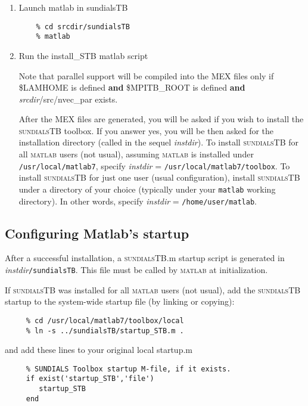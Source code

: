 \documentclass[titlepage,10pt]{article}
\newcommand{\sundialsTB}{{\normalfont\scshape sundialsTB}}
\newcommand{\matlab}{{\normalfont\scshape matlab}}
\begin{document}
\begin{enumerate}

\item Launch matlab in sundialsTB
\begin{verbatim}
    % cd srcdir/sundialsTB
    % matlab
\end{verbatim}

\item Run the install\_STB matlab script

     Note that parallel support will be compiled into the MEX files only if
     \$LAMHOME is defined {\bf and}
     \$MPITB\_ROOT is defined {\bf and}
     {\em srcdir}/src/nvec\_par exists.

     After the MEX files are generated, you will be asked if you wish to install 
     the {\sundialsTB} toolbox. If you answer yes, you will be then asked for the
     installation directory (called in the sequel {\em instdir}). 
     To install {\sundialsTB} for all {\matlab} users (not usual), assuming {\matlab} is 
     installed under {\tt /usr/local/matlab7}, specify
        {\em instdir} = {\tt /usr/local/matlab7/toolbox}.
     To install {\sundialsTB} for just one user (usual configuration), install      
     {\sundialsTB} under a directory of your choice (typically under your {\tt matlab}
     working directory). In other words, specify
        {\em instdir} = {\tt /home/user/matlab}.

\end{enumerate}

\subsection{Configuring Matlab's startup}

After a successful installation, a {\sundialsTB}.m startup script is generated
in {\em instdir}{\tt /sundialsTB}. This file must be called by {\matlab} at initialization.

If {\sundialsTB} was installed for all {\matlab} users (not usual), add the {\sundialsTB} 
startup to the system-wide startup file (by linking or copying):

\begin{verbatim}
     % cd /usr/local/matlab7/toolbox/local
     % ln -s ../sundialsTB/startup_STB.m .
\end{verbatim}

and add these lines to your original local startup.m

\begin{verbatim}
     % SUNDIALS Toolbox startup M-file, if it exists.
     if exist('startup_STB','file')
        startup_STB
     end
\end{verbatim}
\end{document}
